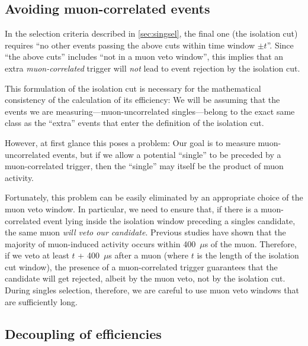 \documentclass[../thesis.tex]{subfiles}
\begin{document}
\subsection{Avoiding muon-correlated events}
\label{sec:avoidmuoncorr}

In the selection criteria described in \autoref{sec:singsel}, the final one (the isolation cut) requires ``no other events passing the above cuts within time window $\pm t$''. Since ``the above cuts'' includes ``not in a muon veto window'', this implies that an extra \emph{muon-correlated} trigger will \emph{not} lead to event rejection by the isolation cut.

This formulation of the isolation cut is necessary for the mathematical consistency of the calculation of its efficiency: We will be assuming that the events we are measuring---muon-uncorrelated singles---belong to the exact same class as the ``extra'' events that enter the definition of the isolation cut.

However, at first glance this poses a problem: Our goal is to measure muon-uncorrelated events, but if we allow a potential ``single'' to be preceded by a muon-correlated trigger, then the ``single'' may itself be the product of muon activity.

Fortunately, this problem can be easily eliminated by an appropriate choice of the muon veto window. In particular, we need to ensure that, if there is a muon-correlated event lying inside the isolation window preceding a singles candidate, the same muon \emph{will veto our candidate}. Previous studies have shown that the majority of muon-induced activity occurs within 400~$\mu$s of the muon. Therefore, if we veto at least $t$ + 400~$\mu$s after a muon (where $t$ is the length of the isolation cut window), the presence of a muon-correlated trigger guarantees that the candidate will get rejected, albeit by the muon veto, not by the isolation cut. During singles selection, therefore, we are careful to use muon veto windows that are sufficiently long.

\subsection{Decoupling of efficiencies}
\label{sec:effdecoup}

\def\Pa{\ensuremath{P_\mathrm{a}}} \def\Pb{\ensuremath{P_\mathrm{b}}}
\def\Pab{\ensuremath{P_\mathrm{ab}}}
\end{document}
